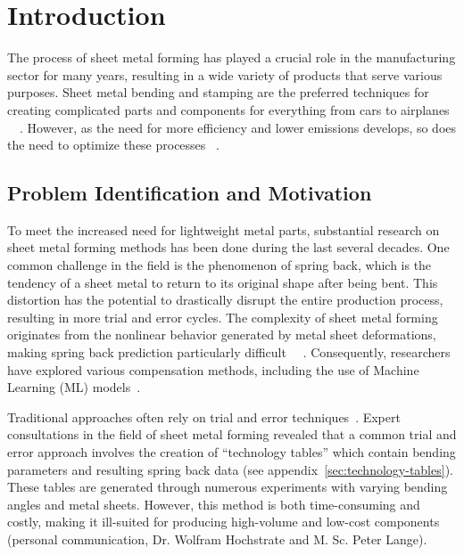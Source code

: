 \chapter{Introduction}\label{ch:introduction}

The process of sheet metal forming has played a crucial role in the manufacturing sector for many years, resulting in
a wide variety of products that serve various purposes.
Sheet metal bending and stamping are the preferred techniques for creating complicated parts and components for
everything from cars to airplanes
~\cite[p. 1]{cruz2021application}~\cite[p.1]{liu2021deep}.
However, as the need for more efficiency and lower emissions develops, so does the need to optimize these processes
~\cite[p. 4]{zheng_reviewformingtechniques_2018}.


\section{Problem Identification and Motivation}\label{sec:problem-identification-and-motivation}
To meet the increased need for lightweight metal parts, substantial research on sheet metal forming methods has been
done during the last several decades.
One common challenge in the field is the phenomenon of spring back, which is the tendency of a sheet metal to return
to its original shape after being bent.
This distortion has the potential to drastically disrupt the entire production process, resulting in more trial and
error cycles.
The complexity of sheet metal forming originates from the nonlinear behavior generated by metal sheet deformations,
making spring back prediction particularly difficult
~\cite[p. 1]{miranda_formingspringbackprediction_2018}~\cite[p. 1]{cruz2021application}.
Consequently, researchers have explored various compensation methods, including the use of Machine Learning (ML)
models~\cite[p.1]{liu2021deep}.

Traditional approaches often rely on trial and error techniques~\cite[p. 1]{dib2020single}.
Expert consultations in the field of sheet metal forming revealed that a common trial and error approach involves the
creation of ``technology tables'' which contain bending parameters and resulting spring back data
(see appendix~\ref{sec:technology-tables}).
These tables are generated through numerous experiments with varying bending angles and metal sheets.
However, this method is both time-consuming and costly, making it ill-suited for producing high-volume and low-cost
components (personal communication, Dr. Wolfram Hochstrate and M. Sc. Peter Lange).

